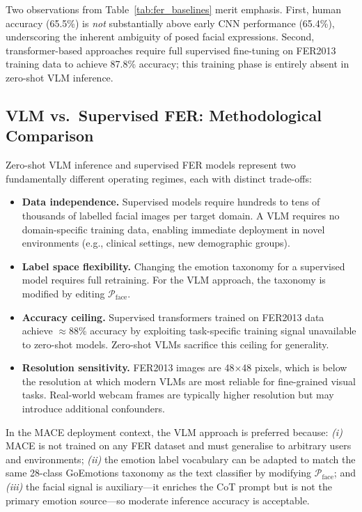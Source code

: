 \documentclass[sigconf, review=true]{acmart}
\begin{document}
Two observations from Table~\ref{tab:fer_baselines} merit
emphasis.
First, human accuracy (65.5\%) is \emph{not} substantially
above early CNN performance (65.4\%), underscoring the
inherent ambiguity of posed facial expressions.
Second, transformer-based approaches require full supervised
fine-tuning on FER2013 training data to achieve 87.8\%
accuracy; this training phase is entirely absent in
zero-shot VLM inference.

\subsection{VLM vs.\ Supervised FER: Methodological Comparison}

Zero-shot VLM inference and supervised FER models represent
two fundamentally different operating regimes, each with
distinct trade-offs:

\begin{itemize}
    \item \textbf{Data independence.}
          Supervised models require hundreds to tens of
          thousands of labelled facial images per target domain.
          A VLM requires no domain-specific training data,
          enabling immediate deployment in novel environments
          (e.g., clinical settings, new demographic groups).
    \item \textbf{Label space flexibility.}
          Changing the emotion taxonomy for a supervised model
          requires full retraining.
          For the VLM approach, the taxonomy is modified by
          editing $\mathcal{P}_{\text{face}}$.
    \item \textbf{Accuracy ceiling.}
          Supervised transformers trained on FER2013 data
          achieve $\approx$88\% accuracy by exploiting
          task-specific training signal unavailable to
          zero-shot models.
          Zero-shot VLMs sacrifice this ceiling for generality.
    \item \textbf{Resolution sensitivity.}
          FER2013 images are 48$\times$48 pixels, which is
          below the resolution at which modern VLMs are most
          reliable for fine-grained visual tasks.
          Real-world webcam frames are typically higher
          resolution but may introduce additional confounders.
\end{itemize}

In the MACE deployment context, the VLM approach is preferred
because:
\textit{(i)} MACE is not trained on any FER dataset and
must generalise to arbitrary users and environments;
\textit{(ii)} the emotion label vocabulary can be adapted
to match the same 28-class GoEmotions taxonomy as the text
classifier by modifying $\mathcal{P}_{\text{face}}$;
and \textit{(iii)} the facial signal is auxiliary---it
enriches the CoT prompt but is not the primary emotion
source---so moderate inference accuracy is acceptable.
\end{document}
